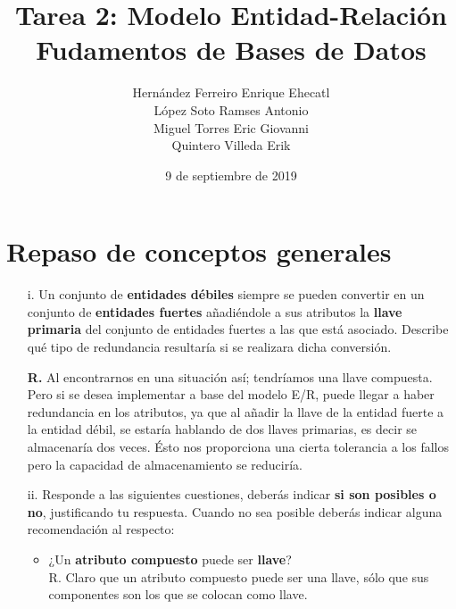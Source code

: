 \documentclass[12pt, letterpaper]{article}
\author{Hernández Ferreiro Enrique Ehecatl \\
        López Soto Ramses Antonio \\
        Miguel Torres Eric Giovanni \\
        Quintero Villeda Erik}
\title{Tarea 2: Modelo Entidad-Relación \\
       {\small Fudamentos de Bases de Datos}}
\date{9 de septiembre de 2019}
\begin{document}
    \maketitle
    
    \section{Repaso de conceptos generales}

        \begin{itemize}
            \item[i.] Un conjunto de \textbf{entidades débiles} siempre se pueden
                     convertir en un conjunto de \textbf{entidades fuertes}
                     añadiéndole a sus atributos la \textbf{llave primaria} del
                     conjunto de entidades fuertes a las que está asociado.
                     Describe qué tipo de redundancia resultaría si se realizara
                     dicha conversión. \vspace{.1cm}
                     
                     \textbf{R.} Al encontrarnos en una situación así; tendríamos 
                                 una llave compuesta. Pero si se desea implementar
                                 a base del modelo E/R, puede llegar a haber
                                 redundancia en los atributos, ya que al añadir la
                                 llave de la entidad fuerte a la entidad débil, se
                                 estaría hablando de dos llaves primarias, es decir
                                 se almacenaría dos veces. Ésto nos proporciona una
                                 cierta tolerancia a los fallos pero la capacidad de
                                 almacenamiento se reduciría. \vspace{.2cm}

            \item[ii.] Responde a las siguientes cuestiones, deberás indicar
                      \textbf{si son posibles o no}, justificando tu respuesta.
                      Cuando no sea posible deberás indicar alguna recomendación
                      al respecto:

                      \begin{itemize}
                          \item ¿Un \textbf{atributo compuesto} puede ser 
                                \textbf{llave}? \\
                                R. Claro que un atributo compuesto puede ser una
                                   llave, sólo que sus componentes son los que se
                                   colocan como llave.\\


\end{itemize}
\end{itemize}
\end{document}
